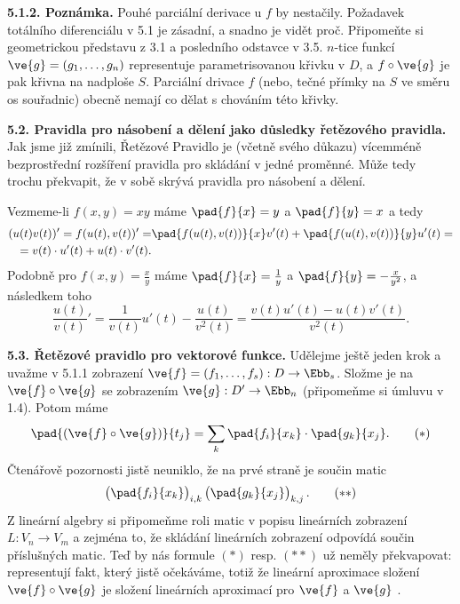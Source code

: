 \documentclass[12pt]{article}
\begin{document}
{\medskip

{\bf 5.1.2. Poznámka.} Pouhé parciální derivace u $f$ by nestačily.
Požadavek totálního diferenciálu v 5.1
je zásadní, a snadno je vidět proč. Připomeňte si geometrickou představu z 3.1 a posledního odstavce v 3.5. 
 $n$-tice funkcí $\ve{g}=(g_1,\dots,g_n)$ 
representuje parametrisovanou křivku v $D$, a $f\circ\ve{g}$ je pak křivna na
nadploše $S$. Parciální drivace $f$ (nebo, tečné přímky na  $S$ ve směru os souřadnic)
obecně nemají co dělat s chováním této křivky.

\bigskip

{\bf 5.2. Pravidla pro násobení a dělení jako důsledky řetězového pravidla.} Jak jsme již zmínili, Řetězové Pravidlo je (včetně svého důkazu) vícemméně bezprostřední rozšíření pravidla pro skládání v jedné proměnné. 
Může tedy trochu překvapit, že v sobě skrývá pravidla pro násobení a dělení.

Vezmeme-li $f(x,y)=xy$ máme $\pad{f}{x}=y$ a $\pad{f}{y}=x$ a tedy
$$
\begin{aligned}
(u(t)v(t))'=f(u(t),v(t))'=&\pad{f(u(t),v(t))}{x}v'(t)+\pad{f(u(t),v(t))}{y}u'(t)=\\
=v(t)\cdot u'(t)+ u(t)\cdot v'(t).
\end{aligned}
$$
Podobně pro $f(x,y)=\frac{x}{y}$ máme $\pad{f}{x}=\frac{1}{y}$ a $\pad{f}{y}=-\frac{x}{y^2}$, a následkem toho 
$$
\frac{u(t)}{v(t)}'= \frac{1}{v(t)}u'(t)-\frac{u(t)}{v^2(t)}=
\frac{v(t)u'(t)-u(t)v'(t)}{v^2(t)}.
$$

\bigskip

{\bf 5.3. Řetězové pravidlo pro vektorové funkce.} Udělejme ještě jeden krok a uvažme v 5.1.1 zobrazení
 $\ve{f}=(f_1,\dots,f_s):D\to\Ebb_s$. Složme je na $\ve{f}\circ\ve{g}$ 
se zobrazením $\ve{g}:D'\to\Ebb_n$ (připomeňme si úmluvu v 1.4). Potom máme
\begin{equation}
\pad{(\ve{f}\circ \ve{g})}{t_j}=\sum_k\pad{f_i}{x_k}\cdot\pad{g_k}{x_j}. \tag{$*$}
\end{equation}
Čtenářově pozornosti jistě neuniklo, že na prvé straně je součin matic
\begin{equation}
\begin{pmatrix}\pad{f_i}{x_k}\end{pmatrix}_{i,k}\begin{pmatrix}\pad{g_k}{x_j}\end{pmatrix}_{k,j}. \tag{$**$}
\end{equation}
Z lineární algebry si připomeňme roli matic v popisu lineárních zobrazení
$L:V_n\to V_m$ a zejména to, že  skládání lineárních zobrazení  odpovídá součin příslušných matic. Teď by nás formule  $(*)$ resp. $(**)$ už neměly překvapovat: 
representují fakt, který jistě očekáváme, totiž že
lineární aproximace složení  $\ve{f}\circ\ve{g}$ je složení lineárních aproximací 
pro $\ve{f}$ a $\ve{g}$ .

}
\end{document}
